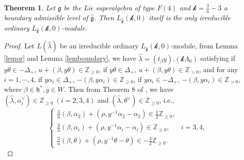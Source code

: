 \documentclass[12pt]{article}
\newtheorem{thm}{Theorem}[section]
\begin{document}
\begin{thm}\label{thmf4}
Let $\mathfrak{g}$ be the Lie superalgebra of type $F(4)$ and
$\mathcal{k}=\frac{3}{u}-3$ a boundary admissible level of $\widehat{\mathfrak{g}}$.
Then $L_{\widehat{\mathfrak{g}}}(\mathcal{k},0)$ itself is the only irreducible ordinary $L_{\widehat{\mathfrak{g}}}(\mathcal{k},0)$-module.
\end{thm}
\begin{proof}
Let $L(\hat{\lambda})$ be an irreducible ordinary $L_{\widehat{\mathfrak{g}}}(\mathcal{k},0)$-module,
from Lemma \ref{lemor} and Lemma \ref{lemboundary}, we have $\hat{\lambda}=(t_\beta y).(\mathcal{k}\Lambda_0)$
satisfying if $y\theta\in -\Delta_+$, $u+(\beta,y\theta)\in\mathbb{Z}_{\geq0}$,
if $y\theta\in \Delta_+$, $u+(\beta,y\theta)\in\mathbb{Z}_{>0}$,
and for any $i=1,\cdots,4$,
if $y\alpha_i\in \Delta_+$, $-(\beta,y\alpha_i)\in\mathbb{Z}_{\geq0}$,
if $y\alpha_i\in -\Delta_+$, $-(\beta,y\alpha_i)\in\mathbb{Z}_{>0}$,
where $\beta\in \mathfrak{h}^*, y\in W$.
Then from Theorem 8 of \cite{Kac77}, we have
$(\hat{\lambda}, \alpha_i^\vee)\in \mathbb{Z}_{\geq0} ~(i=2,3,4)$ and $(\hat{\lambda}, \theta^\vee)\in \mathbb{Z}_{\geq0}$,
i.e.,
$$\begin{cases}
 \frac{3}{u}(\beta,\alpha_2)+(\rho,y^{-1}\alpha_2-\alpha_2)\in \frac{1}{2}\mathbb{Z}_{\geq0},\\
  \frac{3}{u}(\beta,\alpha_i)+(\rho,y^{-1}\alpha_i-\alpha_i)\in \mathbb{Z}_{\geq0}, &i=3,4,\\
 \frac{3}{u}(\beta,\theta)+(\rho,y^{-1}\theta-\theta)\in -\frac{3}{2}\mathbb{Z}_{\geq0}.
\end{cases}$$


\end{proof}
\end{document}
